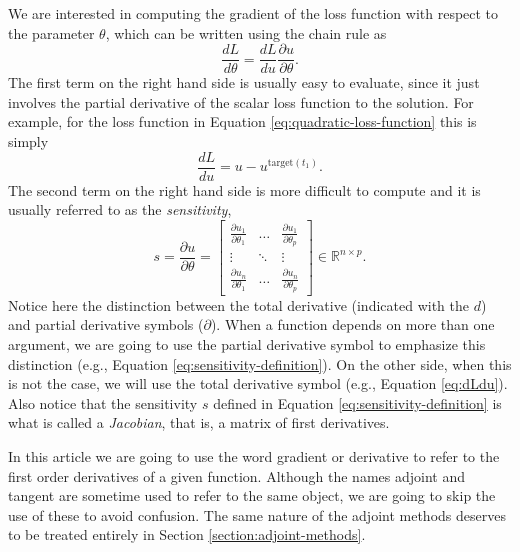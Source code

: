 We are interested in computing the gradient of the loss function with respect to the parameter $\theta$, which can be written using the chain rule as
\begin{equation}
 \frac{dL}{d\theta} = \frac{dL}{du} \frac{\partial u}{\partial \theta}.
 \label{eq:dLdtheta_VJP}
\end{equation} 
The first term on the right hand side is usually easy to evaluate, since it just involves the partial derivative of the scalar loss function to the solution.
For example, for the loss function in Equation \eqref{eq:quadratic-loss-function} this is simply
\begin{equation}
    \frac{dL}{du} = u - u^{\text{target}(t_1)}.
    \label{eq:dLdu}
\end{equation}
The second term on the right hand side is more difficult to compute and it is usually referred to as the \textit{sensitivity},
\begin{equation}
 s 
 = 
 \frac{\partial u}{\partial \theta} 
 =
 \begin{bmatrix}
   \frac{\partial u_1}{\partial \theta_1} & \dots & \frac{\partial u_1}{\partial \theta_p} \\
   \vdots & \ddots & \vdots \\
   \frac{\partial u_n}{\partial \theta_1} & \dots & \frac{\partial u_n}{\partial \theta_p}
 \end{bmatrix}
 \in \mathbb R^{n \times p}.
 \label{eq:sensitivity-definition}
\end{equation}
Notice here the distinction between the total derivative (indicated with the $d$) and partial derivative symbols ($\partial$). 
When a function depends on more than one argument, we are going to use the partial derivative symbol to emphasize this distinction (e.g., Equation \eqref{eq:sensitivity-definition}). 
On the other side, when this is not the case, we will use the total derivative symbol (e.g., Equation \eqref{eq:dLdu}).
Also notice that the sensitivity $s$ defined in Equation \eqref{eq:sensitivity-definition} is what is called a \textit{Jacobian}, that is, a matrix of first derivatives.

In this article we are going to use the word gradient or derivative to refer to the first order derivatives of a given function. 
Although the names adjoint and tangent are sometime used to refer to the same object, we are going to skip the use of these to avoid confusion.
The same nature of the adjoint methods deserves to be treated entirely in Section \ref{section:adjoint-methods}.